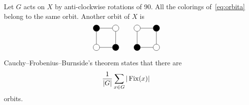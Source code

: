 \begin{example}
Let $G$ acts on $X$ by anti-clockwise rotations  
of 90\textdegree. All the colorings of~\eqref{eq:orbita} belong to the same orbit. 
Another orbit of $X$ is
\[
\begin{tikzpicture}
    \node[shape=circle,draw=black,fill=black] (A) at (1,0) {};
    \node[shape=circle,draw=black] (B) at (1,1) {};
    \node[shape=circle,draw=black,fill=black] (C) at (0,1) {};
    \node[shape=circle,draw=black] (D) at (0,0) {};
    \path [-](A) edge node[left]{} (B);
    \path [-](B) edge node[left]{} (C);
    \path [-](C) edge node[left]{} (D);
    \path [-](D) edge node[left]{} (A);
\end{tikzpicture}
\qquad
\begin{tikzpicture}
    \node[shape=circle,draw=black] (A) at (1,0) {};
    \node[shape=circle,draw=black,fill=black] (B) at (1,1) {};
    \node[shape=circle,draw=black] (C) at (0,1) {};
    \node[shape=circle,draw=black,fill=black] (D) at (0,0) {};
    \path [-](A) edge node[left]{} (B);
    \path [-](B) edge node[left]{} (C);
    \path [-](C) edge node[left]{} (D);
    \path [-](D) edge node[left]{} (A);
\end{tikzpicture}
\]

Cauchy--Frobenius--Burnside's theorem states that
there are  
\[
\frac{1}{|G|}\sum_{x\in G}|\operatorname{Fix}(x)|
\]
orbits. 


\end{example}
